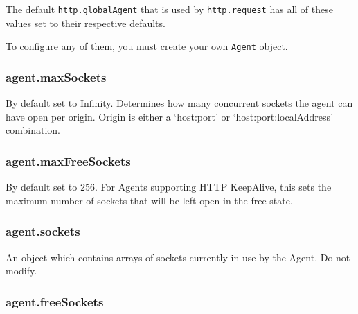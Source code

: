 The default \texttt{http.globalAgent} that is used by
\texttt{http.request} has all of these values set to their respective
defaults.

To configure any of them, you must create your own \texttt{Agent}
object.

\begin{Shaded}
\begin{Highlighting}[]
 \NormalTok{(}\NormalTok{);}
  \NormalTok{(\{ }\NormalTok{: } \NormalTok{\});}
 
\end{Highlighting}
\end{Shaded}

\subsubsection{agent.maxSockets}\label{agent.maxsockets}

By default set to Infinity. Determines how many concurrent sockets the
agent can have open per origin. Origin is either a `host:port' or
`host:port:localAddress' combination.

\subsubsection{agent.maxFreeSockets}\label{agent.maxfreesockets}

By default set to 256. For Agents supporting HTTP KeepAlive, this sets
the maximum number of sockets that will be left open in the free state.

\subsubsection{agent.sockets}\label{agent.sockets}

An object which contains arrays of sockets currently in use by the
Agent. Do not modify.

\subsubsection{agent.freeSockets}\label{agent.freesockets}

